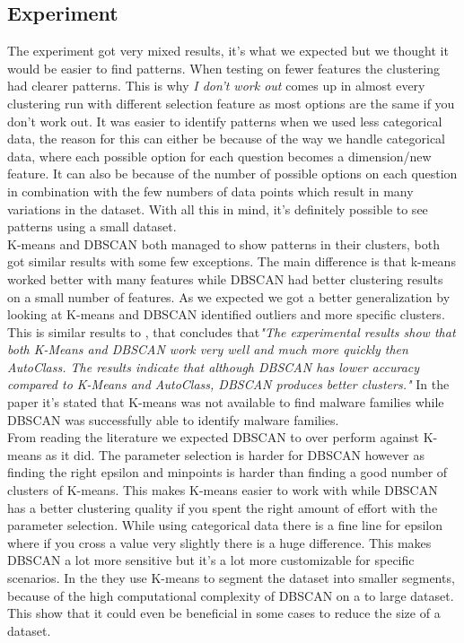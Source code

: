 \documentclass[a4paper]{article}
\begin{document}
\subsection{Experiment}
The experiment got very mixed results, it's what we expected but we thought it would be easier to find patterns. When testing on fewer features the clustering had clearer patterns. This is why \textit{I don't work out} comes up in almost every clustering run with different selection feature as most options are the same if you don't work out. It was easier to identify patterns when we used less categorical data, the reason for this can either be because of the way we handle categorical data, where each possible option for each question becomes a dimension/new feature. It can also be because of the number of possible options on each question in combination with the few numbers of data points which result in many variations in the dataset. With all this in mind, it's definitely possible to see patterns using a small dataset. 
\newline\\K-means and DBSCAN both managed to show patterns in their clusters, both got similar 
results with some few exceptions. The main difference is that k-means worked better with many 
features while DBSCAN had better clustering results on a small number of features. As we expected 
we got a better generalization by looking at K-means and DBSCAN identified outliers and more 
specific clusters. This is similar results to \cite{erman2006traffic}, that concludes 
that\textit{"The experimental results show that both K-Means and DBSCAN work very well and much 
more quickly then AutoClass. The results indicate that although DBSCAN has lower accuracy compared 
to K-Means and AutoClass, DBSCAN produces better clusters."}
In the paper \cite{Kinable2011MalwareCB} it's stated that K-means was not available to find malware families while DBSCAN was successfully able to identify malware families.\\\newline
From reading the literature we expected DBSCAN to over perform 
against K-means as it did. The parameter selection 
is harder for DBSCAN however as finding the right epsilon and minpoints is harder than finding a good number of clusters of K-means. This makes K-means easier to work with while DBSCAN has a better clustering quality if you spent the right amount of effort with the parameter selection. While using categorical data there is a fine line for epsilon where if you cross a value very slightly there is a huge difference. This makes DBSCAN a lot more sensitive but it's a lot more customizable for specific scenarios. In the \cite{k-meansDBSCANhybird} they use K-means to segment the dataset into smaller segments, because of the high computational complexity of DBSCAN on a to large dataset. This show that it could even be beneficial in some cases to reduce the size of a dataset.
\end{document}
